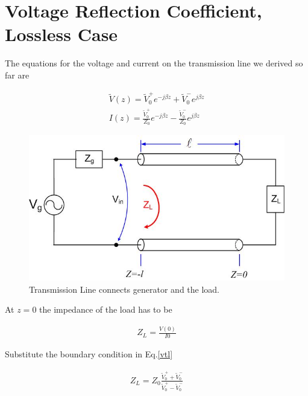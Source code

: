 \documentclass{ximera}
\begin{document}
\section{Voltage Reflection Coefficient, Lossless Case}

The equations for the voltage and current on the transmission line we
derived so far are

\begin{eqnarray}
\tilde{V}(z)=\tilde{V}_0^+ e^{-j \beta z} +\tilde{V}_0^- e^{j \beta z} \label{vtl} \\ \label{ctl}
I(z)=\frac{\tilde{V}_0^+}{Z_0} e^{- j \beta z} - \frac{\tilde{V}_0^-}{Z_0} e^{j \beta z}
\end{eqnarray}



\begin{figure}[htbp]
\begin{center}
\includegraphics[scale=0.3]{../jpg/trline.jpg}
\end{center}
\caption{Transmission Line connects generator and the load.}
\label{wind1}
\end{figure}





At $z=0$ the impedance of the load has to be

\begin{eqnarray}
Z_L=\frac{V(0)}{I{0}} \nonumber 
\end{eqnarray}

Substitute the boundary condition in Eq.\ref{vtl}

\begin{eqnarray}
Z_L=Z_0 \frac{\tilde{V}_0^+ + \tilde{V}_0^-}{\tilde{V}_0^+ - \tilde{V}_0^-}
\end{eqnarray}
\end{document}
